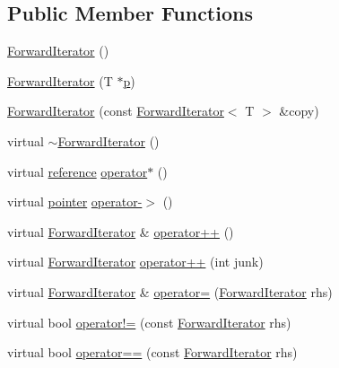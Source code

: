 \subsection*{Public Member Functions}
\begin{DoxyCompactItemize}
\item 
\hyperlink{classprism_1_1_forward_iterator_afb4641262fffdf091e86f0a7a7f7c081}{Forward\+Iterator} ()
\item 
\hyperlink{classprism_1_1_forward_iterator_a299beab946214925361571d60932d73c}{Forward\+Iterator} (T $\ast$\hyperlink{classprism_1_1_forward_iterator_a44e23472687df2dcf68780ba6173557a}{p})
\item 
\hyperlink{classprism_1_1_forward_iterator_a0074d4d447574ffcb3e5fb3a7e65f03d}{Forward\+Iterator} (const \hyperlink{classprism_1_1_forward_iterator}{Forward\+Iterator}$<$ T $>$ \&copy)
\item 
virtual \hyperlink{classprism_1_1_forward_iterator_acf0522ade2f87fca58f009036a906bcc}{$\sim$\+Forward\+Iterator} ()
\item 
virtual \hyperlink{classprism_1_1_forward_iterator_a4f7bff2c238f447c1537c74fe09f8935}{reference} \hyperlink{classprism_1_1_forward_iterator_ade3a6920b9b41d33e47bbe5f9b3263b5}{operator$\ast$} ()
\item 
virtual \hyperlink{classprism_1_1_forward_iterator_af50dd6e13f3cea3ee3b2332e48996502}{pointer} \hyperlink{classprism_1_1_forward_iterator_a8ec70818980d62bc629d220bb8d54dc8}{operator-\/$>$} ()
\item 
virtual \hyperlink{classprism_1_1_forward_iterator}{Forward\+Iterator} \& \hyperlink{classprism_1_1_forward_iterator_af49be3da85db82c7e257131184df16de}{operator++} ()
\item 
virtual \hyperlink{classprism_1_1_forward_iterator}{Forward\+Iterator} \hyperlink{classprism_1_1_forward_iterator_a94acbaa5cf9777c760e8080a9bfe714e}{operator++} (int junk)
\item 
virtual \hyperlink{classprism_1_1_forward_iterator}{Forward\+Iterator} \& \hyperlink{classprism_1_1_forward_iterator_a3426335fb087ac914902e5b94717de99}{operator=} (\hyperlink{classprism_1_1_forward_iterator}{Forward\+Iterator} rhs)
\item 
virtual bool \hyperlink{classprism_1_1_forward_iterator_a38ace2c6e529bc58cc8cf6b933d579a0}{operator!=} (const \hyperlink{classprism_1_1_forward_iterator}{Forward\+Iterator} rhs)
\item 
virtual bool \hyperlink{classprism_1_1_forward_iterator_a24028fff385dcae1ce13a28ec3d92f6b}{operator==} (const \hyperlink{classprism_1_1_forward_iterator}{Forward\+Iterator} rhs)
\end{DoxyCompactItemize}
